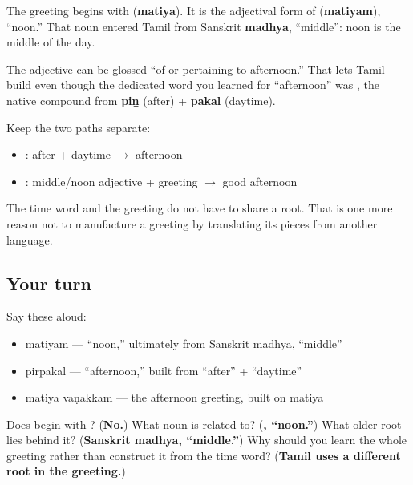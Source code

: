 \begin{cousinweb}
The greeting begins with \textbf{} (\textbf{matiya}). It is the adjectival form of \textbf{} (\textbf{matiyam}), \textquotedblleft{}noon.\textquotedblright{} That noun entered Tamil from Sanskrit \textbf{madhya}, \textquotedblleft{}middle\textquotedblright{}: noon is the middle of the day.

The adjective \textbf{} can be glossed \textquotedblleft{}of or pertaining to afternoon.\textquotedblright{} That lets Tamil build \textbf{ } even though the dedicated word you learned for \textquotedblleft{}afternoon\textquotedblright{} was \textbf{}, the native compound from \textbf{piṉ} (after) + \textbf{pakal} (daytime).

Keep the two paths separate:

\begin{itemize}
\raggedright
  \item \textbf{}: after + daytime $\to$ afternoon
  \item \textbf{ }: middle/noon adjective + greeting $\to$ good afternoon
\end{itemize}

The time word and the greeting do not have to share a root. That is one more reason not to manufacture a greeting by translating its pieces from another language.
\end{cousinweb}

\subsection*{Your turn}
Say these aloud:

\begin{itemize}
\raggedright
  \item matiyam — \textquotedblleft{}noon,\textquotedblright{} ultimately from Sanskrit madhya, \textquotedblleft{}middle\textquotedblright{}
  \item pirpakal — \textquotedblleft{}afternoon,\textquotedblright{} built from \textquotedblleft{}after\textquotedblright{} + \textquotedblleft{}daytime\textquotedblright{}
  \item matiya vaṇakkam — the afternoon greeting, built on matiya
\end{itemize}

\begin{tcolorbox}[breakable,colback=teal!4,colframe=teal!35!black,title={Before you move on}]
Does \textbf{ } begin with \textbf{}? (\textbf{No.}) What noun is \textbf{} related to? (\textbf{, \textquotedblleft{}noon.\textquotedblright{}}) What older root lies behind it? (\textbf{Sanskrit madhya, \textquotedblleft{}middle.\textquotedblright{}}) Why should you learn the whole greeting rather than construct it from the time word? (\textbf{Tamil uses a different root in the greeting.})
\end{tcolorbox}
